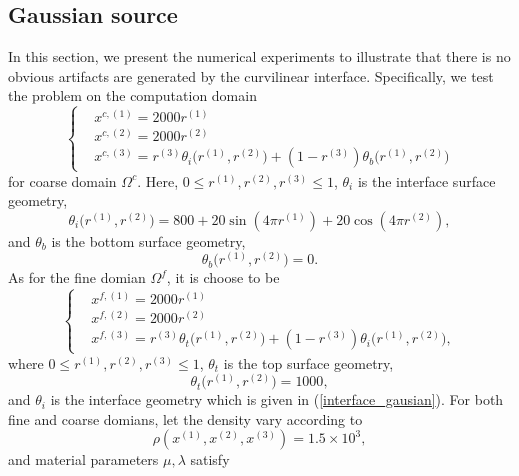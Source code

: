 \subsection{Gaussian source}\label{gaussian_source}
In this section, we present the numerical experiments to illustrate that there is no obvious artifacts are generated by the curvilinear interface. Specifically, we test the problem on the computation domain
\begin{equation}
\left\{
\begin{aligned}
& x^{c,(1)} = 2000 r^{(1)}\\
& x^{c,(2)} = 2000 r^{(2)}\\
& x^{c,(3)} = r^{(3)} \theta_i\big(r^{(1)}, r^{(2)}\big) + (1-r^{(3)}) \theta_b\big(r^{(1)},r^{(2)}\big)
\end{aligned}
\right.
\end{equation}
for coarse domain $\Omega^c$. Here, $0\leq r^{(1)}, r^{(2)}, r^{(3)}\leq 1$, $\theta_i$ is the interface surface geometry,
\begin{equation}\label{interface_gausian}
\theta_i\big(r^{(1)},r^{(2)}\big) = 800+20\sin(4\pi r^{(1)})+20\cos(4\pi r^{(2)}),
\end{equation}
and 
$\theta_b$ is the bottom surface geometry,
\begin{equation}
\theta_b\big(r^{(1)},r^{(2)}\big) = 0.
\end{equation}
As for the fine domian $\Omega^f$, it is choose to be
\begin{equation}
\left\{
\begin{aligned}
& x^{f,(1)} = 2000 r^{(1)}\\
& x^{f,(2)} = 2000 r^{(2)}\\
& x^{f,(3)} = r^{(3)}\theta_t\big(r^{(1)},r^{(2)}\big) + (1-r^{(3)})\theta_i\big(r^{(1)},r^{(2)}\big),
\end{aligned}
\right.
\end{equation}
where $0\leq r^{(1)}, r^{(2)}, r^{(3)}\leq 1$, $\theta_t$ is the top surface geometry,
\begin{equation}
\theta_t\big(r^{(1)},r^{(2)}\big) = 1000,
\end{equation}
and $\theta_i$ is the interface geometry which is given in (\ref{interface_gausian}). For both fine and coarse domians, let the density vary according to
\begin{equation}
\rho(x^{(1)},x^{(2)},x^{(3)}) = 1.5\times 10^3,
\end{equation}
and material parameters $\mu, \lambda$ satisfy
